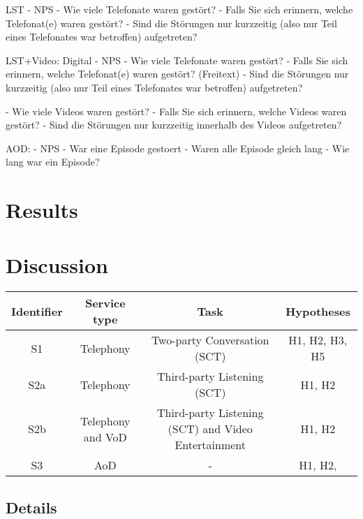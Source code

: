 LST
- NPS
- Wie viele Telefonate waren gestört?
- Falls Sie sich erinnern, welche Telefonat(e) waren gestört?
- Sind die Störungen nur kurzzeitig (also nur Teil eines Telefonates war betroffen) aufgetreten?

LST+Video: Digital
- NPS
- Wie viele Telefonate waren gestört? 
- Falls Sie sich erinnern, welche Telefonat(e) waren gestört? (Freitext)
- Sind die Störungen nur kurzzeitig (also nur Teil eines Telefonates war betroffen) aufgetreten?

- Wie viele Videos waren gestört?
- Falls Sie sich erinnern, welche Videos waren gestört?
- Sind die Störungen nur kurzzeitig innerhalb des Videos aufgetreten?

AOD:
- NPS
- War eine Episode gestoert
- Waren alle Episode gleich lang
- Wie lang war ein Episode?

\section{Results}
\section{Discussion}
\begin{table}[h]
	\begin{tabular}{|c|c|c|c|}
	Identifier	& Service type 			& Task 									& Hypotheses \\
	\hline
	S1			& Telephony				& Two-party Conversation (\ac{SCT})	& H1, H2, H3, H5 \\
	S2a			& Telephony				& Third-party Listening	(\ac{SCT})		& H1, H2 \\ 
	S2b			& Telephony and \ac{VoD}& Third-party Listening	(\ac{SCT}) and Video Entertainment & H1, H2 \\  %
	S3			& \ac{AoD}				& -										& H1, H2,
	\end{tabular}
\end{table}

\subsection{Details}


